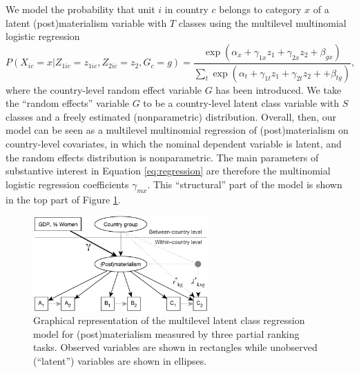 \documentclass[letterpaper,12pt]{article}
\begin{document}
We  model the probability that unit $i$ in country $c$ belongs to category $x$ of a latent (post)materialism variable with $T$ classes using the multilevel multinomial logistic regression
\begin{equation}
P(X_{ic} = x| Z_{1ic} = z_{1ic}, Z_{2ic} = z_2, G_c = g) = \frac{\exp(\alpha_x + \gamma_{1x} z_1 +\gamma_{2x} z_2  + \beta_{gx})}
					{\sum_t \exp(\alpha_t + \gamma_{1t} z_1 +  \gamma_{2t} z_2 +  + \beta_{tg})},
					\label{eq:regression}
\end{equation}
where the country-level random effect variable $G$ has been introduced. We take the ``random effects'' variable $G$ to be a country-level latent class variable with $S$ classes and a freely estimated (nonparametric) distribution. Overall, then, our model can be seen as a multilevel multinomial regression of (post)materialism on country-level covariates, in which the nominal dependent variable is latent, and the random effects distribution is nonparametric. The main parameters of substantive interest in Equation \ref{eq:regression} are therefore the multinomial logistic regression coefficients $\gamma_{mx}$. This ``structural'' part of the model is shown in the top part of Figure \ref{fig:model}.


\begin{figure}\centering
	\includegraphics[width=0.6\textwidth]{figures/model}
	\caption{\label{fig:model}Graphical representation of 
	the multilevel latent class regression model for 
	(post)materialism measured by three partial ranking tasks. Observed variables are shown in rectangles while unobserved (``latent'') variables are shown in ellipses.	}
\end{figure}
\end{document}
